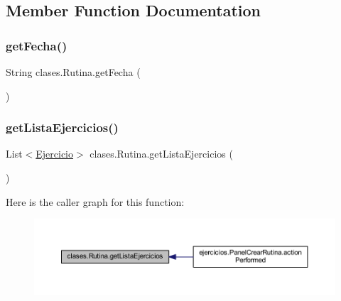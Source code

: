 \subsection{Member Function Documentation}
\mbox{\label{classclases_1_1_rutina_abc6d6df453739c6166aafbfb77b1bedb}} 
\subsubsection{\texorpdfstring{get\+Fecha()}{getFecha()}}
{\footnotesize\ttfamily String clases.\+Rutina.\+get\+Fecha (\begin{DoxyParamCaption}{ }\end{DoxyParamCaption})}

\mbox{\label{classclases_1_1_rutina_ad861444ab5cf8946d898100d8bfd58a0}} 
\subsubsection{\texorpdfstring{get\+Lista\+Ejercicios()}{getListaEjercicios()}}
{\footnotesize\ttfamily List$<$\mbox{\hyperlink{classclases_1_1_ejercicio}{Ejercicio}}$>$ clases.\+Rutina.\+get\+Lista\+Ejercicios (\begin{DoxyParamCaption}{ }\end{DoxyParamCaption})}

Here is the caller graph for this function\+:
\nopagebreak
\begin{figure}[H]
\begin{center}
\leavevmode
\includegraphics[width=350pt]{classclases_1_1_rutina_ad861444ab5cf8946d898100d8bfd58a0_icgraph}
\end{center}
\end{figure}
\mbox{\label{classclases_1_1_rutina_ae4dab6884b2425ccfa957bbc5663bac7}} 
